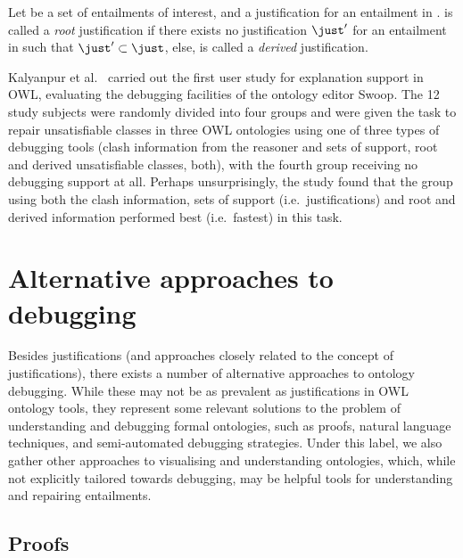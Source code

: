 \begin{defn}
Let \entset be a set of entailments of interest, and \just a justification for an entailment \ent in \entset. \just is called a \emph{root} justification if there exists no justification $\just'$ for an entailment in \entset such that $\just' \subset \just$, else, \just is called a \emph{derived} justification.
\end{defn}

Kalyanpur et al.\ \cite{kalyanpur05mi} carried out the first user study for explanation support in OWL, evaluating the debugging facilities of the ontology editor Swoop. The 12 study subjects were randomly divided into four groups and were given the task to repair unsatisfiable classes in three OWL ontologies using one of three types of debugging tools (clash information from the reasoner and sets of support, root and derived unsatisfiable classes, both), with the fourth group receiving no debugging support at all. Perhaps unsurprisingly, the study found that the group using both the clash information, sets of support (i.e.\ justifications) and root and derived information performed best (i.e.\ fastest) in this task.



\section{Alternative approaches to debugging}
Besides justifications (and approaches closely related to the concept of justifications), there exists a number of alternative approaches to ontology debugging. While these may not be as prevalent as justifications in OWL ontology tools, they represent some relevant solutions to the problem of understanding and debugging formal ontologies, such as proofs, natural language techniques, and semi-automated debugging strategies. Under this label, we also gather other approaches to visualising and understanding ontologies, which, while not explicitly tailored towards debugging, may be helpful tools for understanding and repairing entailments.

\subsection{Proofs}

